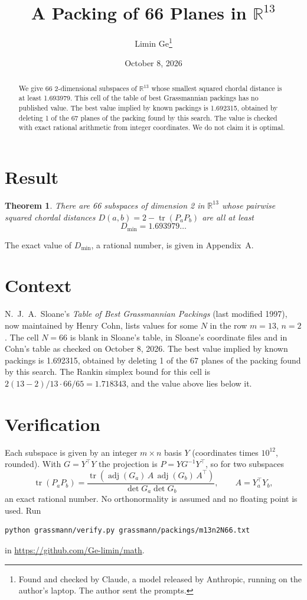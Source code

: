 \documentclass[11pt,a4paper]{article}
\title{A Packing of 66 Planes in $\mathbb{R}^{13}$}
\author{Limin Ge\thanks{Found and checked by Claude, a model released by Anthropic, running on the author's laptop. The author sent the prompts.}}
\date{October 8, 2026}
\newtheorem*{theorem}{Theorem}
\begin{document}
\maketitle
\begin{abstract}
We give 66 2-dimensional subspaces of $\mathbb{R}^{13}$ whose smallest squared chordal distance is at least 1.693979. This cell of the table of best Grassmannian packings has no published value. The best value implied by known packings is 1.692315, obtained by deleting 1 of the 67 planes of the packing found by this search. The value is checked with exact rational arithmetic from integer coordinates. We do not claim it is optimal.
\end{abstract}

\section{Result}
\begin{theorem}
There are 66 subspaces of dimension 2 in $\mathbb{R}^{13}$ whose pairwise squared chordal distances $D(a,b) = 2 - \operatorname{tr}(P_aP_b)$ are all at least
\[ D_{\min} = 1.693979\ldots \]
\end{theorem}
The exact value of $D_{\min}$, a rational number, is given in Appendix~A.


\section{Context}
N.~J.~A.~Sloane's \emph{Table of Best Grassmannian Packings} (last modified 1997), now maintained by Henry Cohn, lists values for some $N$ in the row $m=13$, $n=2$. The cell $N=66$ is blank in Sloane's table, in Sloane's coordinate files and in Cohn's table as checked on October 8, 2026. The best value implied by known packings is 1.692315, obtained by deleting 1 of the 67 planes of the packing found by this search. The Rankin simplex bound for this cell is $2(13-2)/13\cdot 66/65 = 1.718343$, and the value above lies below it.


\section{Verification}
Each subspace is given by an integer $m\times n$ basis $Y$ (coordinates times $10^{12}$, rounded). With $G=Y^\top Y$ the projection is $P=YG^{-1}Y^\top$, so for two subspaces
\[ \operatorname{tr}(P_aP_b)=\frac{\operatorname{tr}(\operatorname{adj}(G_a)\,A\,\operatorname{adj}(G_b)\,A^\top)}{\det G_a\det G_b},\qquad A=Y_a^\top Y_b, \]
an exact rational number. No orthonormality is assumed and no floating point is used. Run
\begin{verbatim}
python grassmann/verify.py grassmann/packings/m13n2N66.txt
\end{verbatim}
in \url{https://github.com/Ge-limin/math}.
\end{document}
